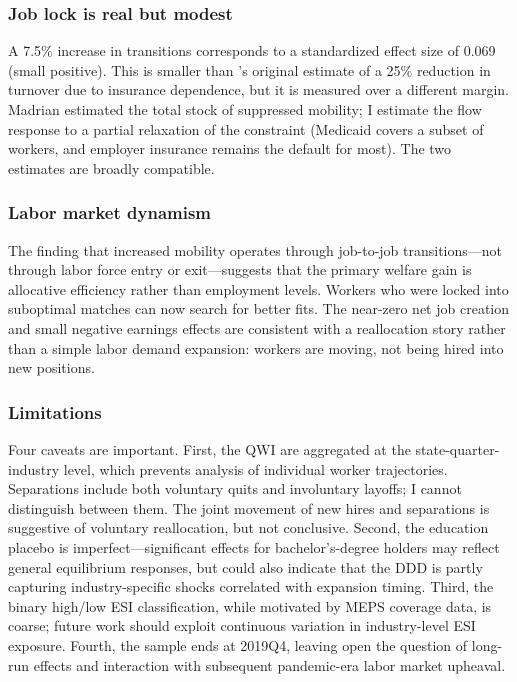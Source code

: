 \documentclass[12pt]{article}
\begin{document}
\subsubsection*{Job lock is real but modest} A 7.5\% increase in transitions corresponds to a standardized effect size of 0.069 (small positive). This is smaller than \citet{madrian1994employment}'s original estimate of a 25\% reduction in turnover due to insurance dependence, but it is measured over a different margin. Madrian estimated the total stock of suppressed mobility; I estimate the flow response to a partial relaxation of the constraint (Medicaid covers a subset of workers, and employer insurance remains the default for most). The two estimates are broadly compatible.

\subsubsection*{Labor market dynamism} The finding that increased mobility operates through job-to-job transitions---not through labor force entry or exit---suggests that the primary welfare gain is allocative efficiency rather than employment levels. Workers who were locked into suboptimal matches can now search for better fits. The near-zero net job creation and small negative earnings effects are consistent with a reallocation story rather than a simple labor demand expansion: workers are moving, not being hired into new positions.

\subsubsection*{Limitations} Four caveats are important. First, the QWI are aggregated at the state-quarter-industry level, which prevents analysis of individual worker trajectories. Separations include both voluntary quits and involuntary layoffs; I cannot distinguish between them. The joint movement of new hires and separations is suggestive of voluntary reallocation, but not conclusive. Second, the education placebo is imperfect---significant effects for bachelor's-degree holders may reflect general equilibrium responses, but could also indicate that the DDD is partly capturing industry-specific shocks correlated with expansion timing. Third, the binary high/low ESI classification, while motivated by MEPS coverage data, is coarse; future work should exploit continuous variation in industry-level ESI exposure. Fourth, the sample ends at 2019Q4, leaving open the question of long-run effects and interaction with subsequent pandemic-era labor market upheaval.
\end{document}

